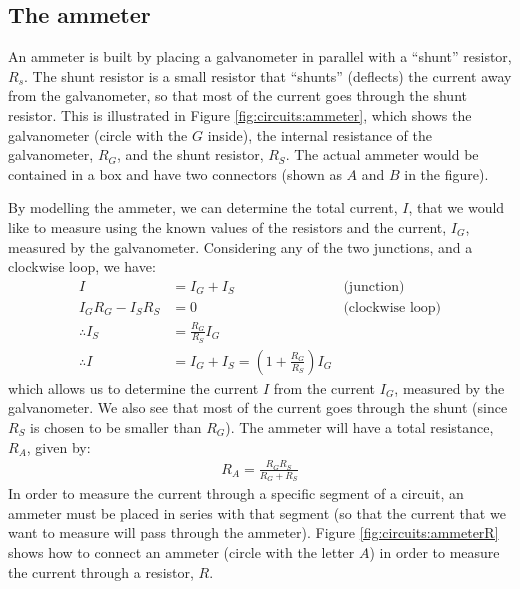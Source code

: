 \subsection{The ammeter}
An ammeter is built by placing a galvanometer in parallel with a ``shunt'' resistor, $R_s$. The shunt resistor is a small resistor that ``shunts'' (deflects) the current away from the galvanometer, so that most of the current goes through the shunt resistor. This is illustrated in Figure \ref{fig:circuits:ammeter}, which shows the galvanometer (circle with the $G$ inside), the internal resistance of the galvanometer, $R_G$, and the shunt resistor, $R_S$. The actual ammeter would be contained in a box and have two connectors (shown as $A$ and $B$ in the figure). 


By modelling the ammeter, we can determine the total current, $I$, that we would like to measure using the known values of the resistors and the current, $I_G$, measured by the galvanometer. Considering any of the two junctions, and a clockwise loop, we have:
\begin{align*}
I&=I_G+I_S \quad&\text{(junction)}\\
I_GR_G-I_SR_S&=0\quad&\text{(clockwise loop)}\\
\therefore I_S&=\frac{R_G}{R_S}I_G\\
\therefore I &= I_G+I_S=\left(1+\frac{R_G}{R_S}\right) I_G
\end{align*}  
which allows us to determine the current $I$ from the current $I_G$, measured by the galvanometer. We also see that most of the current goes through the shunt (since $R_S$ is chosen to be smaller than $R_G$). The ammeter will have a total resistance, $R_A$, given by:
\begin{align*}
R_A=\frac{R_GR_S}{R_G+R_S}
\end{align*}
In order to measure the current through a specific segment of a circuit, an ammeter must be placed in series with that segment (so that the current that we want to measure will pass through the ammeter). Figure \ref{fig:circuits:ammeterR} shows how to connect an ammeter (circle with the letter $A$) in order to measure the current through a resistor, $R$.


